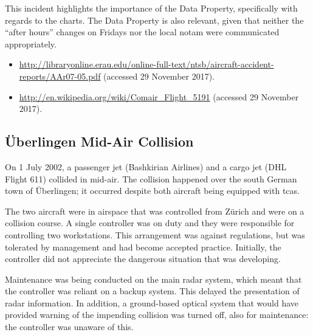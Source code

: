 This incident highlights the importance of the  Data Property, specifically with regards to the charts. The  Data Property is also relevant, given that neither the ``after hours'' changes on Fridays nor the local \gls{notam} were communicated appropriately.

\begin{samepage}
\begin{itemize}
  \item \raggedright{\href{http://libraryonline.erau.edu/online-full-text/ntsb/aircraft-accident-reports/AAr07-05.pdf}{http://libraryonline.erau.edu/online-full-text/ntsb/aircraft-accident-reports/AAr07-05.pdf} (accessed 29 November 2017).}
	\item \raggedright{\href{http://en.wikipedia.org/wiki/Comair_Flight_5191}{http://en.wikipedia.org/wiki/Comair\_Flight\_5191} (accessed 29 November 2017).}
\end{itemize}
\end{samepage}


\subsection{\"Uberlingen Mid-Air Collision} \label{bkm:incacc:uberlingen}
On 1 July 2002, a passenger jet (Bashkirian Airlines) and a cargo jet (DHL Flight 611) collided in mid-air. The collision happened over the south German town of \"Uberlingen; it occurred despite both aircraft being equipped with \gls{tcas}.

The two aircraft were in airspace that was controlled from Z\"urich and were on a collision course. A single controller was on duty and they were responsible for controlling two workstations. This arrangement was against regulations, but was tolerated by management and had become accepted practice. Initially, the controller did not appreciate the dangerous situation that was developing.

Maintenance was being conducted on the main radar system, which meant that the controller was reliant on a backup system. This delayed the presentation of radar \gls{information}. In addition, a ground-based optical system that would have provided warning of the impending collision was turned off, also for maintenance: the controller was unaware of this.

